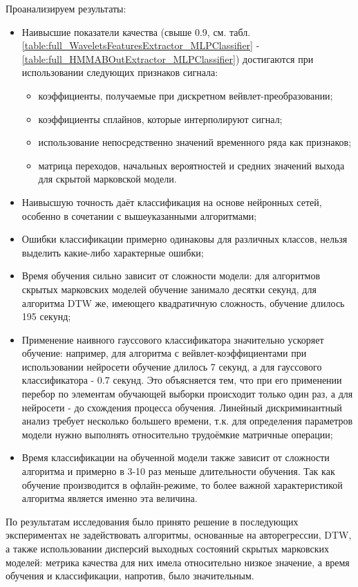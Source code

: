 Проанализируем результаты:
\begin{itemize}
\item Наивысшие показатели качества (свыше 0.9, см. табл. \ref{table:full_WaveletsFeaturesExtractor_MLPClassifier} - \ref{table:full_HMMABOutExtractor_MLPClassifier}) достигаются при использовании следующих признаков сигнала:  
  \begin{itemize}
  \item коэффициенты, получаемые при дискретном вейвлет-преобразовании;
  \item коэффициенты сплайнов, которые интерполируют сигнал;
  \item использование непосредственно значений временного ряда как признаков;
  \item матрица переходов, начальных вероятностей и средних значений выхода для скрытой марковской модели.
  \end{itemize}
\item Наивысшую точность даёт классификация на основе нейронных сетей, особенно в сочетании с вышеуказанными алгоритмами;
\item Ошибки классификации примерно одинаковы для различных классов, нельзя выделить какие-либо характерные ошибки;
\item Время обучения сильно зависит от сложности модели: для алгоритмов скрытых марковских моделей обучение занимало десятки секунд, для алгоритма DTW же, имеющего квадратичную сложность, обучение длилось 195 секунд;
\item Применение наивного гауссового классификатора значительно ускоряет обучение: например, для алгоритма с вейвлет-коэффициентами при использовании нейросети обучение длилось 7 секунд, а для гауссового классификатора - 0.7 секунд. Это объясняется тем, что при его применении перебор по элементам обучающей выборки происходит только один раз, а для нейросети - до схождения процесса обучения. Линейный дискриминантный анализ требует несколько большего времени, т.к. для определения параметров модели нужно выполнять относительно трудоёмкие матричные операции;
\item Время классификации на обученной модели также зависит от сложности алгоритма и примерно в 3-10 раз меньше длительности обучения. Так как обучение производится в офлайн-режиме, то более важной характеристикой алгоритма является именно эта величина.
\end{itemize}

По результатам исследования было принято решение в последующих экспериментах не задействовать алгоритмы, основанные на авторегрессии, DTW, а также использовании дисперсий выходных состояний скрытых марковских моделей: метрика качества для них имела относительно низкое значение, а время обучения и классификации, напротив, было значительным.

